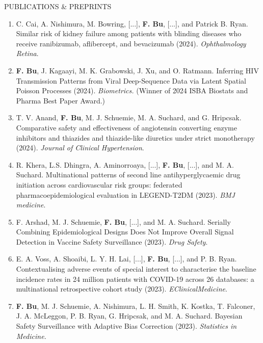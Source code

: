 \documentclass{resume} %
\newcommand{\myName}[1]{\textbf{#1}}
\begin{document}
\begin{rSection}{PUBLICATIONS \& PREPRINTS}
\begin{enumerate}[{label=\arabic*\addtocounter{enumi}{-2}., itemsep=3pt, parsep=0pt, topsep=3pt, start=\value{pubtotal}, leftmargin=0pt}]
	\item C. Cai, A. Nishimura, M. Bowring, [...], \myName{F. Bu}, [...], and Patrick B. Ryan. Similar risk of kidney failure among patients with blinding diseases who receive ranibizumab, aflibercept, and bevacizumab (2024). \emph{Ophthalmology Retina}.
	
	\item \myName{F. Bu}, J. Kagaayi, M. K. Grabowski, J. Xu, and O. Ratmann.
	Inferring HIV Transmission Patterns from Viral Deep-Sequence Data via Latent Spatial Poisson Processes (2024). \emph{Biometrics.} 
	(Winner of 2024 ISBA Biostats and Pharma Best Paper Award.)
	
	
	\item 
	T. V. Anand, \myName{F. Bu}, M. J. Schuemie, M. A. Suchard, and G. Hripcsak. Comparative safety and effectiveness of angiotensin converting enzyme inhibitors and thiazides and thiazide-like diuretics under strict monotherapy (2024).  \emph{Journal of Clinical Hypertension}.
	
	\item 
	R. Khera, L.S. Dhingra, A. Aminorroaya, [...], \myName{F. Bu}, [...], and  M. A. Suchard.  Multinational patterns of second line antihyperglycaemic drug initiation across cardiovascular risk groups: federated pharmacoepidemiological evaluation in LEGEND-T2DM (2023). \emph{BMJ medicine}. 
	
	\item 
	F. Arshad, M. J. Schuemie, \myName{F. Bu}, [...], and M. A. Suchard. Serially Combining Epidemiological Designs Does Not Improve Overall Signal Detection in Vaccine Safety Surveillance (2023). \emph{Drug Safety}. 
	
	\item 
	E. A. Voss, A. Shoaibi, L. Y. H. Lai,  [...], \myName{F. Bu}, [...], and P. B. Ryan. Contextualising adverse events of special interest to characterise the baseline incidence rates in 24 million patients with COVID-19 across 26 databases: a multinational retrospective cohort study (2023). \emph{EClinicalMedicine}. 

	
	\item \myName{F. Bu}, M. J. Schuemie,  A. Nishimura, L. H. Smith, K. Kostka, T. Falconer, J. A. McLeggon, P. B. Ryan, G. Hripcsak, and M. A. Suchard.
	Bayesian Safety Surveillance with Adaptive Bias Correction (2023). \emph{Statistics in Medicine.} %


\end{enumerate}
\end{rSection}
\end{document}
